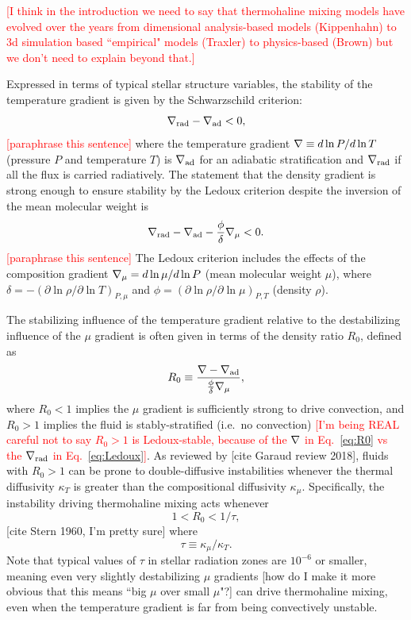 \textcolor{red}{[I think in the introduction we need to say that thermohaline mixing models have evolved over the years from dimensional analysis-based models (Kippenhahn) to 3d simulation based ``empirical" models (Traxler) to physics-based (Brown) but we don't need to explain beyond that.]}

Expressed in terms of typical stellar structure variables, the stability of the temperature gradient is given by the Schwarzschild criterion:
\begin{equation} \label{eq:Schwarzschild}
    \gradrad - \gradad < 0,
\end{equation}
\textcolor{red}{[paraphrase this sentence]} where the temperature gradient $\nabla \equiv d \ln P / d \ln T$ (pressure $P$ and temperature $T$) is $\nabla_{\rm{ad}}$ for an adiabatic stratification and $\nabla_{\rm{rad}}$ if all the flux is carried radiatively. 
The statement that the density gradient is strong enough to ensure stability by the Ledoux criterion despite the inversion of the mean molecular weight is
\begin{equation} \label{eq:Ledoux}
    \gradrad - \gradad - \frac{\phi}{\delta}\gradmu < 0.
\end{equation}
\textcolor{red}{[paraphrase this sentence]} The Ledoux criterion includes the effects of the composition gradient $\nabla_{\mu} = d\ln\mu/d\ln P$ (mean molecular weight $\mu$), where $\delta = -(\partial \ln \rho / \partial \ln T)_{P,\mu}$ and $\phi = (\partial \ln \rho / \partial \ln\mu)_{P,T}$ (density $\rho$).

The stabilizing influence of the temperature gradient relative to the destabilizing influence of the $\mu$ gradient is often given in terms of the density ratio $R_0$, defined as
\begin{equation} \label{eq:R0}
    R_0 \equiv \frac{\grad - \gradad}{\frac{\phi}{\delta} \gradmu},
\end{equation}
where $R_0 < 1$ implies the $\mu$ gradient is sufficiently strong to drive convection, and $R_0 > 1$ implies the fluid is stably-stratified (i.e.~no convection) \textcolor{red}{[I'm being REAL careful not to say $R_0 > 1$ is Ledoux-stable, because of the $\nabla$ in Eq.~\eqref{eq:R0} vs the $\nabla_{\rm{rad}}$ in Eq.~\eqref{eq:Ledoux}]}. 
As reviewed by [cite Garaud review 2018], fluids with $R_0 > 1$ can be prone to double-diffusive instabilities whenever the thermal diffusivity $\kappa_T$ is greater than the compositional diffusivity $\kappa_\mu$. Specifically, the instability driving thermohaline mixing acts whenever
\begin{equation} \label{eq:R0_condition}
1 < R_0 < 1/\tau,
\end{equation}
[cite Stern 1960, I'm pretty sure] where
\begin{equation} \label{eq:tau}
    \tau \equiv \kappa_\mu/\kappa_T.
\end{equation}
Note that typical values of $\tau$ in stellar radiation zones are $10^{-6}$ or smaller, meaning even very slightly destabilizing $\mu$ gradients [how do I make it more obvious that this means ``big $\mu$ over small $\mu$"?] can drive thermohaline mixing, even when the temperature gradient is far from being convectively unstable.

